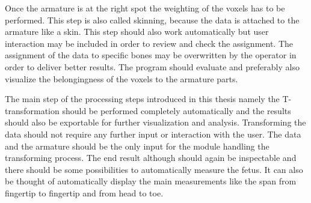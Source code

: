 Once the armature is at the right spot the weighting of the voxels has to be performed. This step is also called skinning, because the data is attached to the armature like a skin. This step should also work automatically but user interaction may be included in order to review and check the assignment. The assignment of the data to specific bones may be overwritten by the operator in order to deliver better results. The program should evaluate and preferably also visualize the belongingness of the voxels to the armature parts.\newline

The main step of the processing steps introduced in this thesis namely the T-transformation should be performed completely automatically and the results should also be exportable for further visualization and analysis. Transforming the data should not require any further input or interaction with the user. The data and the armature should be the only input for the module handling the transforming process. The end result although should again be inspectable and there should be some possibilities to automatically measure the fetus. It can also be thought of automatically display the main measurements like the span from fingertip to fingertip and from head to toe.  
